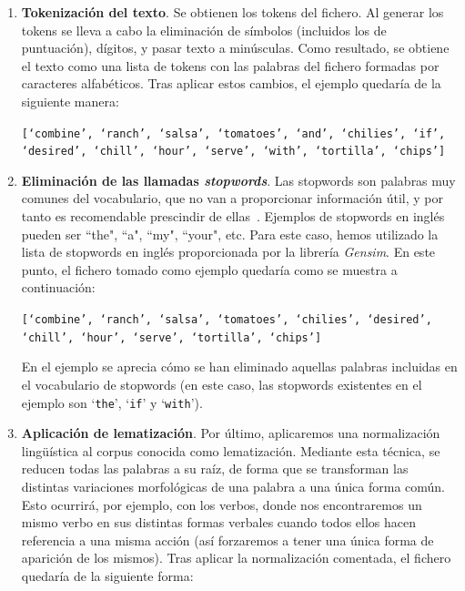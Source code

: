 \begin{enumerate}
    
    \item \textbf{Tokenización del texto}. Se obtienen los tokens del fichero. Al generar los tokens se lleva a cabo la eliminación de símbolos (incluidos los de puntuación), dígitos, y pasar texto a minúsculas. Como resultado, se obtiene el texto como una lista de tokens con las palabras del fichero formadas por caracteres alfabéticos. Tras aplicar estos cambios, el ejemplo quedaría de la siguiente manera:
    
    \begin{center}
    
        \texttt{[`combine', `ranch', `salsa', `tomatoes', `and', `chilies', `if', `desired', `chill', `hour', `serve', `with', `tortilla', `chips']}
        
    \end{center}
    
    
    \item \textbf{Eliminación de las llamadas \textit{stopwords}}. Las stopwords son palabras muy comunes del vocabulario, que no van a proporcionar información útil, y por tanto es recomendable prescindir de ellas~\cite{saif2014stopwords}. Ejemplos de stopwords en inglés pueden ser ``the", ``a", ``my", ``your", etc. Para este caso, hemos utilizado la lista de stopwords en inglés proporcionada por la librería \textit{Gensim}. En este punto, el fichero tomado como ejemplo quedaría como se muestra a continuación:
    
    \begin{center}
        \texttt{[`combine', `ranch', `salsa', `tomatoes', `chilies', `desired', `chill', `hour', `serve', `tortilla', `chips']}
    \end{center}
    
    En el ejemplo se aprecia cómo se han eliminado aquellas palabras incluidas en el vocabulario de stopwords (en este caso, las stopwords existentes en el ejemplo son `\texttt{the}', `\texttt{if}'  y `\texttt{with}').\\
    

    \item \textbf{Aplicación de lematización}. Por último, aplicaremos una normalización lingüística al corpus conocida como lematización. Mediante esta técnica, se reducen todas las palabras a su raíz, de forma que se transforman las distintas variaciones morfológicas de una palabra a una única forma común. Esto ocurrirá, por ejemplo, con los verbos, donde nos encontraremos un mismo verbo en sus distintas formas verbales cuando todos ellos hacen referencia a una misma acción (así forzaremos a tener una única forma de aparición de los mismos). Tras aplicar la normalización comentada, el fichero quedaría de la siguiente forma:
    

\end{enumerate}
